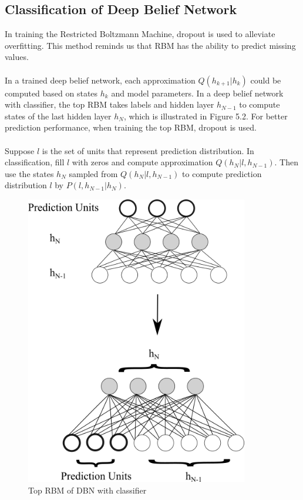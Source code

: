 \documentclass[12pt]{article}
\begin{document}
\subsection{Classification of Deep Belief Network}
In training the Restricted Boltzmann Machine, dropout is used to alleviate overfitting. This method reminds us that RBM has the ability to predict missing values.\\
\\
In a trained deep belief network, each approximation $Q(h_{k+1}|h_k)$ could be computed based on states $h_k$ and model parameters. In a deep belief network with classifier, the top RBM takes labels and hidden layer $h_{N-1}$ to compute states of the last hidden layer $h_N$, which is illustrated in Figure 5.2. For better prediction performance, when training the top RBM, dropout is used.\\
\\
Suppose $l$ is the set of units that represent prediction distribution. In classification, fill $l$ with zeros and compute approximation $Q(h_N|l, h_{N-1})$. Then use the states $h_N$ sampled from $Q(h_N|l, h_{N-1})$ to compute prediction distribution $l$ by $P(l, h_{N-1}| h_N)$.
\begin{figure}[h]
\centering
\includegraphics[height=5.0in]{DBNclass.png}
\caption{Top RBM of DBN with classifier} \label{fig:side:a}
\end{figure}
\end{document}
